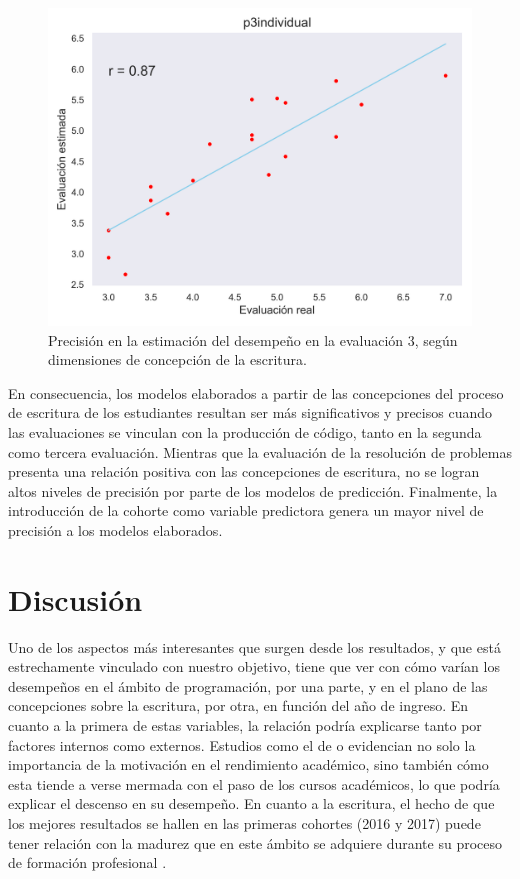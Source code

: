 \documentclass[spanish]{textolivre}
\begin{document}
\begin{figure}[H]
\centering
\begin{minipage}{.75\textwidth}
 \includegraphics[width=\textwidth]{figuras/figura9.png}
 \caption{Precisión en la estimación del desempeño en la evaluación 3, según dimensiones de concepción de la escritura.}
 \label{fig-modelo3}
\end{minipage}
\end{figure}


En consecuencia, los modelos elaborados a partir de las concepciones del proceso de escritura de los estudiantes resultan ser más significativos y precisos cuando las evaluaciones se vinculan con la producción de código, tanto en la segunda como tercera evaluación. Mientras que la evaluación de la resolución de problemas presenta una relación positiva con las concepciones de escritura, no se logran altos niveles de precisión por parte de los modelos de predicción. Finalmente, la introducción de la cohorte como variable predictora genera un mayor nivel de precisión a los modelos elaborados.

\section{Discusión}
Uno de los aspectos más interesantes que surgen desde los resultados, y que está estrechamente vinculado con nuestro objetivo, tiene que ver con cómo varían los desempeños en el ámbito de programación, por una parte, y en el plano de las concepciones sobre la escritura, por otra, en función del año de ingreso. En cuanto a la primera de estas variables, la relación podría explicarse tanto por factores internos como externos. Estudios como el de \textcite{perez2005evolucion} o \textcite{garcia2021transformacion} evidencian no solo la importancia de la motivación en el rendimiento académico, sino también cómo esta tiende a verse mermada con el paso de los cursos académicos, lo que podría explicar el descenso en su desempeño. En cuanto a la escritura, el hecho de que los mejores resultados se hallen en las primeras cohortes (2016 y 2017) puede tener relación con la madurez que en este ámbito se adquiere durante su proceso de formación profesional \cite{valdesleon2022errores}.
\end{document}
